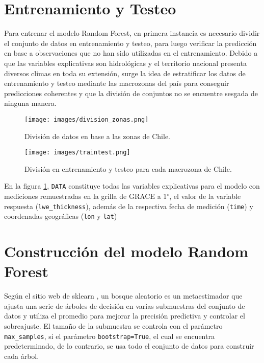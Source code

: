 \section{Entrenamiento y Testeo}
    Para entrenar el modelo Random Forest, en primera instancia es necesario dividir el conjunto de datos en entrenamiento
    y testeo, para luego verificar la predicción en base a observaciones que no han sido utilizadas en el entrenamiento. Debido a que las variables explicativas son hidrológicas y 
    el territorio nacional presenta diversos climas en toda su extensión, surge la idea de estratificar los datos de entrenamiento y testeo mediante las macrozonas del país para conseguir predicciones coherentes 
    y que la división de conjuntos no se encuentre sesgada de ninguna manera.
    \begin{figure}[H]
        \centering
              \texttt{[image: images/division\_zonas.png]}
              \vskip -0.1in
        \caption[División de datos por macrozonas de Chile]{\footnotesize División de datos en base a las zonas de Chile.}
        \label{division}
    \end{figure}

    \begin{figure}[H]
        \centering
            \texttt{[image: images/traintest.png]}
              \vskip -0.1in
        \caption[Entrenamiento y testeo mediante macrozonas]{\footnotesize División en entrenamiento y testeo para cada macrozona de Chile.}
        \label{traintest}
    \end{figure}

    En la figura \ref{division}, \texttt{DATA} constituye todas las variables explicativas para el modelo con mediciones remuestradas en la grilla de GRACE
    a 1$^{\circ}$, el valor de la variable respuesta (\texttt{lwe\_thickness}), además de la respectiva fecha de medición (\texttt{time}) y 
    coordenadas geográficas (\texttt{lon} y \texttt{lat})
%
%
%
%
\section{Construcción del modelo Random Forest}
Según el sitio web de sklearn \cite{rfskl}, un bosque aleatorio es un metaestimador 
que ajusta una serie de árboles de decisión en varias submuestras 
del conjunto de datos y utiliza el promedio para mejorar la precisión predictiva y controlar el sobreajuste. 
El tamaño de la submuestra se controla con el parámetro \texttt{max\_samples}, si el parámetro \texttt{bootstrap=True}, el cual se encuentra predeterminado, 
de lo contrario, se usa todo el conjunto de datos para construir cada árbol.

